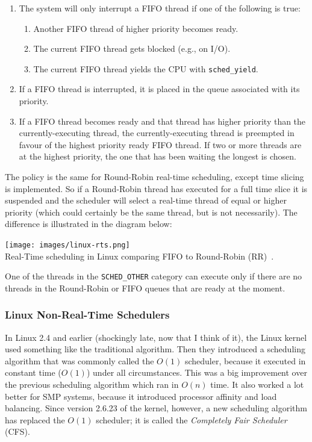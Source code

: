 \begin{enumerate}
	\item The system will only interrupt a FIFO thread if one of the following is true:
	\begin{enumerate}
		\item Another FIFO thread of higher priority becomes ready.
		\item The current FIFO thread gets blocked (e.g., on I/O).
		\item The current FIFO thread yields the CPU with \texttt{sched\_yield}.
	\end{enumerate}
	\item If a FIFO thread is interrupted, it is placed in the queue associated with its priority.
	\item If a FIFO thread becomes ready and that thread has higher priority than the currently-executing thread, the currently-executing thread is preempted in favour of the highest priority ready FIFO thread. If two or more threads are at the highest priority, the one that has been waiting the longest is chosen.
\end{enumerate}

The policy is the same for Round-Robin real-time scheduling, except time slicing is implemented. So if a Round-Robin thread has executed for a full time slice it is suspended and the scheduler will select a real-time thread of equal or higher priority (which could certainly be the same thread, but is not necessarily). The difference is illustrated in the diagram below:

\begin{center}
	\texttt{[image: images/linux-rts.png]}\\
	Real-Time scheduling in Linux comparing FIFO to Round-Robin (RR)~\cite{osi}.
\end{center}

One of the threads in the \texttt{SCHED\_OTHER} category can execute only if there are no threads in the Round-Robin or FIFO queues that are ready at the moment.

\subsubsection*{Linux Non-Real-Time Schedulers}
In Linux 2.4 and earlier (shockingly late, now that I think of it), the Linux kernel used something like the traditional algorithm. Then they introduced a scheduling algorithm that was commonly called the $O(1)$ scheduler, because it executed in constant time ($O(1)$) under all circumstances. This was a big improvement over the previous scheduling algorithm which ran in $O(n)$ time. It also worked a lot better for SMP systems, because it introduced processor affinity and load balancing. Since version 2.6.23 of the kernel, however, a new scheduling algorithm has replaced the $O(1)$ scheduler; it is called the \textit{Completely Fair Scheduler} (CFS).

